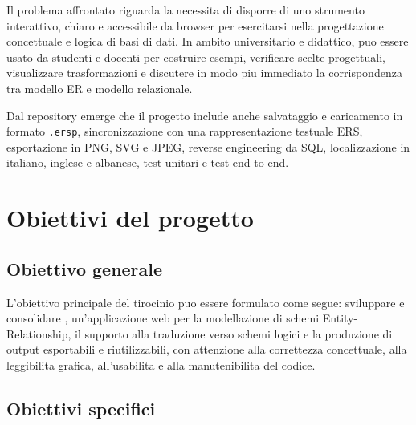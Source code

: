 Il problema affrontato riguarda la necessita di disporre di uno strumento interattivo, chiaro e accessibile da browser per esercitarsi nella progettazione concettuale e logica di basi di dati. In ambito universitario e didattico, \builder{} puo essere usato da studenti e docenti per costruire esempi, verificare scelte progettuali, visualizzare trasformazioni e discutere in modo piu immediato la corrispondenza tra modello ER e modello relazionale.

Dal repository emerge che il progetto include anche salvataggio e caricamento in formato \texttt{.ersp}, sincronizzazione con una rappresentazione testuale ERS, esportazione in PNG, SVG e JPEG, reverse engineering da SQL, localizzazione in italiano, inglese e albanese, test unitari e test end-to-end.

\section{Obiettivi del progetto}

\subsection{Obiettivo generale}

L'obiettivo principale del tirocinio puo essere formulato come segue: sviluppare e consolidare \builder, un'applicazione web per la modellazione di schemi Entity-Relationship, il supporto alla traduzione verso schemi logici e la produzione di output esportabili e riutilizzabili, con attenzione alla correttezza concettuale, alla leggibilita grafica, all'usabilita e alla manutenibilita del codice.

\subsection{Obiettivi specifici}

